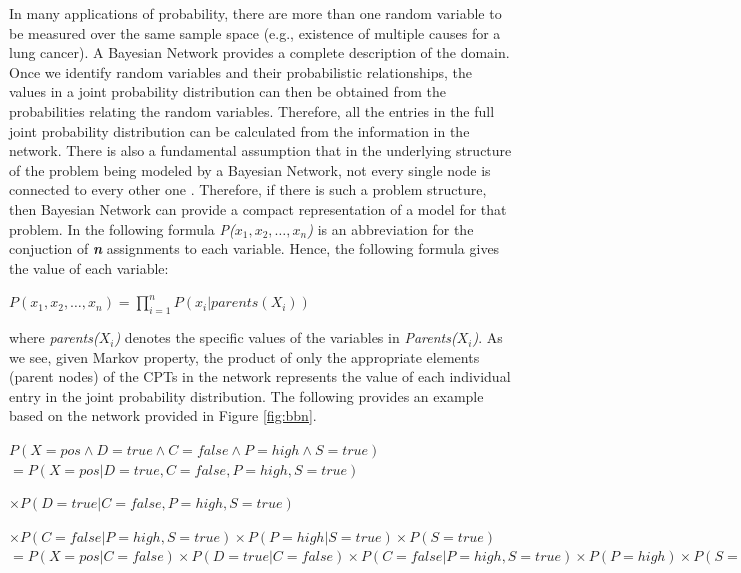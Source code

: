\documentclass[11pt]{article}
\begin{document}
In many applications of probability, there are more than one random variable to
be measured over the same sample space (e.g., existence of multiple causes
for a lung cancer). A Bayesian Network provides a complete description of the
domain. Once we identify random variables and their probabilistic relationships,
the values in a joint probability distribution can then be obtained from the
probabilities relating the random variables. Therefore, all the entries in the
full joint probability distribution can be calculated from the information in
the network. There is also a fundamental assumption that in the underlying
structure of the problem being modeled by a Bayesian Network, not every single
node is connected to every other one \cite{korb:bayesian-ai}. Therefore, if
there is such a problem structure, then Bayesian Network can provide a compact
representation of a model for that problem. In the following formula
\textit{P($x_1, x_2, \ldots, x_n$)} is an abbreviation for the conjuction of
\textit{\textbf{n}} assignments to each variable. Hence, the following formula
gives the value of each variable:

\begin{center}
$P(x_1, x_2, \ldots, x_n) = \prod\limits_{i=1}^{n} P(x_i | parents (X_i))$\\	
\end{center}

\noindent where \textit{parents($X_i$)} denotes the specific values of the
variables in \textit{Parents($X_i$)}. As we see, given Markov property, the
product of only the appropriate elements (parent nodes) of the CPTs in the
network represents the value of each individual entry in the joint probability
distribution. The following provides an example based on the network provided in
Figure \ref{fig:bbn}.\\

\begin{footnotesize}
\noindent $P(X= pos \wedge D = true \wedge C = false \wedge P = high \wedge S =
true)$\\

\noindent $= P(X= pos | D = true , C = false , P = high , S = true)$

\noindent $\times P(D = true | C = false , P = high , S = true)$

\noindent $\times P(C = false | P = high , S = true) \times P(P = high| S =
true) \times P(S = true)$\\

\noindent $= P(X= pos | C = false) \times P(D = true | C = false) \times P(C =
false | P = high , S = true) \times P(P = high) \times P(S = true)$
\end{footnotesize}
\end{document}
